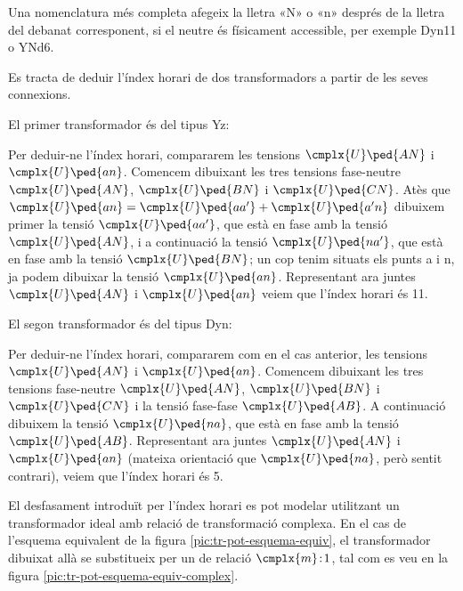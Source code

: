 Una nomenclatura més completa afegeix la lletra «N» o «n» després de la lletra del debanat corresponent, si el neutre és físicament accessible, per exemple Dyn11 o YNd6.

	
\begin{exemple}[\IndexHorari{}]
	\addcontentsxms{\IndexHorari}
    Es tracta de deduir l'índex horari de dos transformadors a partir de les seves connexions.


    El primer transformador és del tipus Yz:
     \vspace{-2mm}
    \begin{center}
        
    \end{center}
     Per deduir-ne l'índex horari, compararem les tensions
    $\cmplx{U}\ped{AN}$ i $\cmplx{U}\ped{an}$. Comencem dibuixant les tres tensions fase-neutre $\cmplx{U}\ped{AN}$, $\cmplx{U}\ped{BN}$ i $\cmplx{U}\ped{CN}$. Atès que $\cmplx{U}\ped{an} = \cmplx{U}\ped{aa'} + \cmplx{U}\ped{a'n}$ dibuixem primer la tensió $\cmplx{U}\ped{aa'}$, que està en fase amb la tensió $\cmplx{U}\ped{AN}$, i a continuació la tensió $\cmplx{U}\ped{na'}$, que està en fase amb la tensió $\cmplx{U}\ped{BN}$; un cop tenim situats els punts a i n, ja podem dibuixar la tensió $\cmplx{U}\ped{an}$. Representant ara juntes $\cmplx{U}\ped{AN}$ i $\cmplx{U}\ped{an}$  veiem que l'índex horari és 11.


     El segon transformador és del tipus Dyn:
      \vspace{-2mm}
    \begin{center}
       
    \end{center}
      Per  deduir-ne l'índex horari, compararem com en el cas anterior, les tensions $\cmplx{U}\ped{AN}$ i $\cmplx{U}\ped{an}$. Comencem dibuixant les tres tensions fase-neutre $\cmplx{U}\ped{AN}$, $\cmplx{U}\ped{BN}$ i $\cmplx{U}\ped{CN}$ i la tensió fase-fase $\cmplx{U}\ped{AB}$.  A continuació dibuixem la tensió $\cmplx{U}\ped{na}$, que està en fase amb la tensió $\cmplx{U}\ped{AB}$. Representant ara juntes $\cmplx{U}\ped{AN}$ i $\cmplx{U}\ped{an}$ (mateixa orientació que $\cmplx{U}\ped{na}$, però sentit contrari),  veiem que l'índex horari és 5.
\end{exemple}

El desfasament introduït per l'índex horari es pot modelar utilitzant  un transformador ideal amb relació de transformació complexa. En el cas de l'esquema equivalent de la figura  \vref{pic:tr-pot-esquema-equiv}, el transformador  dibuixat allà
se substitueix per un de relació $\cmplx{m}\!:\!1$, tal com es veu en la figura \vref{pic:tr-pot-esquema-equiv-complex}.

